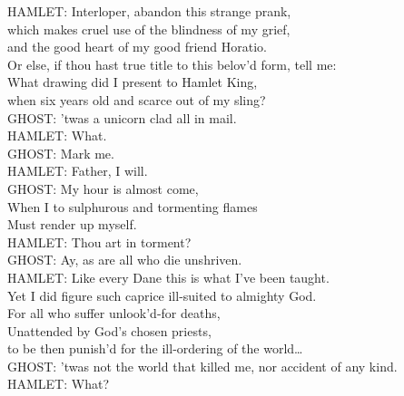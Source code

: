 %
%

\begin{playdialog}%
HAMLET: Interloper, abandon this strange prank,\\
which makes cruel use of the blindness of my grief,\\
and the good heart of my good friend Horatio.\\
Or else, if thou hast true title to this belov’d form, tell me:\\ What drawing did I present to Hamlet King,\\ when six years old and scarce out of my sling?\\

GHOST: ’twas a unicorn clad all in mail.\\

HAMLET: What.\\

GHOST: Mark me.\\

HAMLET: Father, I will.\\

GHOST: My hour is almost come,\\
When I to sulphurous and tormenting flames\\
Must render up myself.\\

HAMLET: Thou art in torment?\\

GHOST: Ay, as are all who die unshriven.\\

HAMLET: Like every Dane this is what I’ve been taught.\\
Yet I did figure such caprice ill-suited to almighty God.\\
For all who suffer unlook’d-for deaths,\\
Unattended by God’s chosen priests,\\
to be then punish’d for the ill-ordering of the world…\\

GHOST: ’twas not the world that killed me, nor accident of any kind.\\

HAMLET: What?\\


\end{playdialog}
